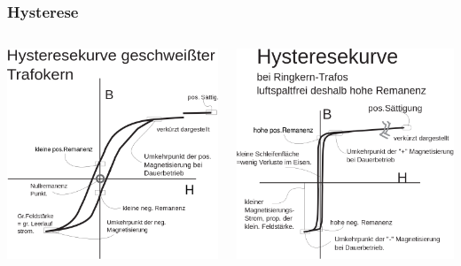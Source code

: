\begin{frame}
    \frametitle{Hysterese}
    \begin{columns}[c]
        \column[c]{5cm}
        \begin{center}
        \includegraphics[width=1\textwidth]{a08/Soft_hysteresis_welded.png}\\
        \tiny \hyperlink{refs}{\cite{wm}}
    \end{center}
    \column{5cm} \large
        \begin{center}
        \includegraphics[width=1\textwidth]{a08/Hard_hysteresis_de.png}\\
        \tiny \hyperlink{refs}{\cite{wm}}
    \end{center}
    \end{columns}
\end{frame}


